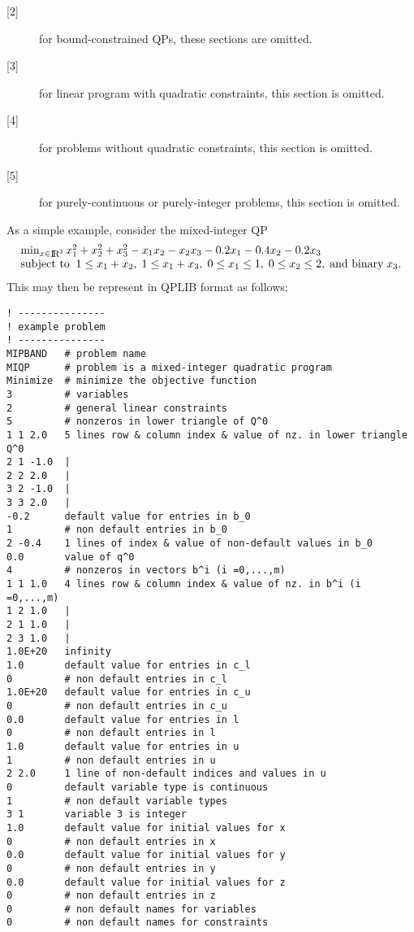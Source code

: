 \begin{description}
\item [{[2]}]
for bound-constrained QPs, these sections are omitted.
\item [{[3]}]
for linear program with quadratic constraints, this section is omitted.
\item [{[4]}]
for problems without quadratic constraints, this section is omitted.
\item [{[5]}]
for purely-continuous or purely-integer problems, this section is omitted.
\end{description}

As a simple example, consider the mixed-integer QP
\[\arr{l}{\min_{x \in \smallRe^3} x_1^2 + x_2^2 + x_3^2 - x_1 x_2 - x_2 x_3
  - 0.2 x_1  -0.4 x_2 - 0.2 x_3 \\
\st 1 \leq x_1 + x_2, \; 1 \leq x_1 + x_3, \; 0 \leq x_1 \leq 1,
\; 0 \leq x_2 \leq 2, \; \mbox{and binary} \; x_3.}
\]
This may then be represent in QPLIB format as follows:

{\small
\begin{verbatim}
! ---------------
! example problem
! ---------------
MIPBAND   # problem name
MIQP      # problem is a mixed-integer quadratic program
Minimize  # minimize the objective function
3         # variables
2         # general linear constraints
5         # nonzeros in lower triangle of Q^0
1 1 2.0   5 lines row & column index & value of nz. in lower triangle Q^0
2 1 -1.0  |
2 2 2.0   |
3 2 -1.0  |
3 3 2.0   |
-0.2      default value for entries in b_0
1         # non default entries in b_0
2 -0.4    1 lines of index & value of non-default values in b_0
0.0       value of q^0
4         # nonzeros in vectors b^i (i =0,...,m)
1 1 1.0   4 lines row & column index & value of nz. in b^i (i =0,...,m)
1 2 1.0   |
2 1 1.0   |
2 3 1.0   |
1.0E+20   infinity
1.0       default value for entries in c_l
0         # non default entries in c_l
1.0E+20   default value for entries in c_u
0         # non default entries in c_u
0.0       default value for entries in l
0         # non default entries in l
1.0       default value for entries in u
1         # non default entries in u
2 2.0     1 line of non-default indices and values in u
0         default variable type is continuous
1         # non default variable types
3 1       variable 3 is integer
1.0       default value for initial values for x
0         # non default entries in x
0.0       default value for initial values for y
0         # non default entries in y
0.0       default value for initial values for z
0         # non default entries in z
0         # non default names for variables
0         # non default names for constraints
\end{verbatim}
}
